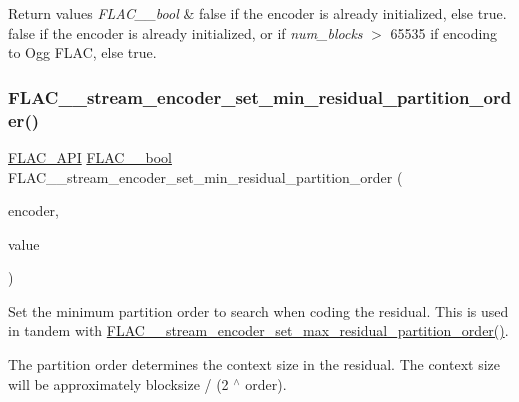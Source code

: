 \begin{DoxyRetVals}{Return values}
{\em F\+L\+A\+C\+\_\+\+\_\+bool} & {\ttfamily false} if the encoder is already initialized, else {\ttfamily true}. {\ttfamily false} if the encoder is already initialized, or if {\itshape num\+\_\+blocks} $>$ 65535 if encoding to Ogg F\+L\+AC, else {\ttfamily true}. \\
\hline
\end{DoxyRetVals}
\mbox{\label{group__flac__stream__encoder_gae3e2dd204f276d051bf1a118383bfda2}} 
\subsubsection{\texorpdfstring{FLAC\_\_stream\_encoder\_set\_min\_residual\_partition\_order()}{FLAC\_\_stream\_encoder\_set\_min\_residual\_partition\_order()}}
{\footnotesize\ttfamily \mbox{\hyperlink{group__flac__export_ga56ca07df8a23310707732b1c0007d6f5}{F\+L\+A\+C\+\_\+\+A\+PI}} \mbox{\hyperlink{ordinals_8h_a95103469f1cbd78b8cf250194985b34e}{F\+L\+A\+C\+\_\+\+\_\+bool}} F\+L\+A\+C\+\_\+\+\_\+stream\+\_\+encoder\+\_\+set\+\_\+min\+\_\+residual\+\_\+partition\+\_\+order (\begin{DoxyParamCaption}\item[{\mbox{\hyperlink{struct_f_l_a_c_____stream_encoder}{F\+L\+A\+C\+\_\+\+\_\+\+Stream\+Encoder}} $\ast$}]{encoder,  }\item[{unsigned}]{value }\end{DoxyParamCaption})}

Set the minimum partition order to search when coding the residual. This is used in tandem with \mbox{\hyperlink{group__flac__stream__encoder_ga6de153da5a8eeeb1be2271c27fa58b37}{F\+L\+A\+C\+\_\+\+\_\+stream\+\_\+encoder\+\_\+set\+\_\+max\+\_\+residual\+\_\+partition\+\_\+order()}}.

The partition order determines the context size in the residual. The context size will be approximately {\ttfamily blocksize / (2 $^\wedge$ order)}.

